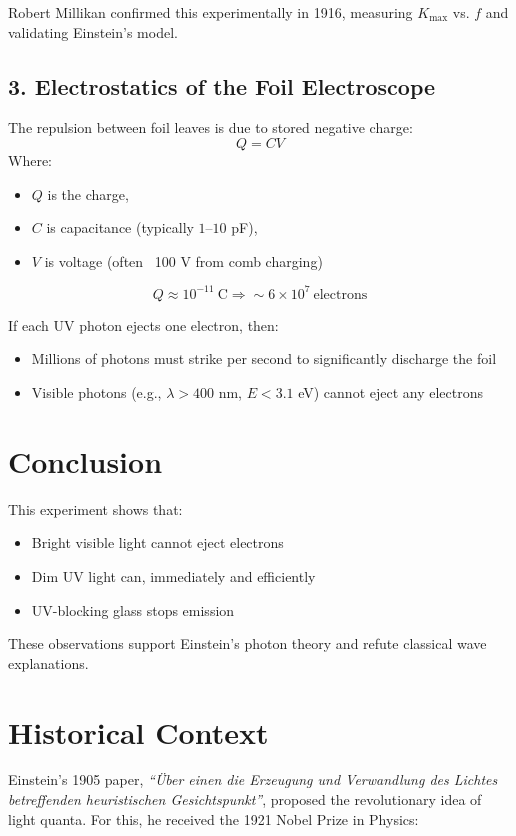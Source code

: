 \documentclass[12pt]{article}
\begin{document}
Robert Millikan confirmed this experimentally in 1916, measuring $K_{\text{max}}$ vs. $f$ and validating Einstein's model.

\subsection*{3. Electrostatics of the Foil Electroscope}
The repulsion between foil leaves is due to stored negative charge:
\[
Q = CV
\]
Where:
\begin{itemize}
    \item $Q$ is the charge,
    \item $C$ is capacitance (typically $1$--$10$ pF),
    \item $V$ is voltage (often ~100 V from comb charging)
\end{itemize}

\[
Q \approx 10^{-11}\ \text{C} \Rightarrow \sim 6 \times 10^7\ \text{electrons}
\]

If each UV photon ejects one electron, then:
\begin{itemize}
    \item Millions of photons must strike per second to significantly discharge the foil
    \item Visible photons (e.g., $\lambda > 400$ nm, $E < 3.1$ eV) cannot eject any electrons
\end{itemize}

\section*{Conclusion}
This experiment shows that:
\begin{itemize}
    \item Bright visible light cannot eject electrons
    \item Dim UV light can, immediately and efficiently
    \item UV-blocking glass stops emission
\end{itemize}

These observations support Einstein's photon theory and refute classical wave explanations.

\section*{Historical Context}
Einstein's 1905 paper, \emph{``Über einen die Erzeugung und Verwandlung des Lichtes betreffenden heuristischen Gesichtspunkt''}, proposed the revolutionary idea of light quanta. For this, he received the 1921 Nobel Prize in Physics:
\end{document}
